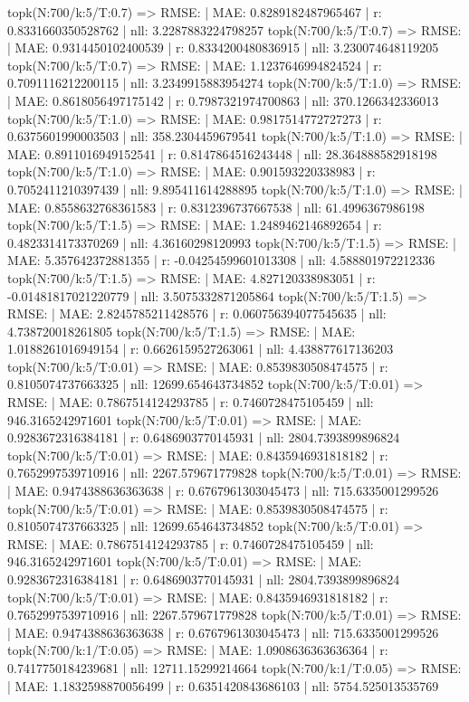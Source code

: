 topk(N:700/k:5/T:0.7) => RMSE: | MAE: 0.8289182487965467 | r: 0.8331660350528762 | nll: 3.2287883224798257
topk(N:700/k:5/T:0.7) => RMSE: | MAE: 0.9314450102400539 | r: 0.8334200480836915 | nll: 3.230074648119205
topk(N:700/k:5/T:0.7) => RMSE: | MAE: 1.1237646994824524 | r: 0.7091116212200115 | nll: 3.2349915883954274
topk(N:700/k:5/T:1.0) => RMSE: | MAE: 0.8618056497175142 | r: 0.7987321974700863 | nll: 370.1266342336013
topk(N:700/k:5/T:1.0) => RMSE: | MAE: 0.9817514772727273 | r: 0.6375601990003503 | nll: 358.2304459679541
topk(N:700/k:5/T:1.0) => RMSE: | MAE: 0.8911016949152541 | r: 0.8147864516243448 | nll: 28.364888582918198
topk(N:700/k:5/T:1.0) => RMSE: | MAE: 0.901593220338983 | r: 0.7052411210397439 | nll: 9.895411614288895
topk(N:700/k:5/T:1.0) => RMSE: | MAE: 0.8558632768361583 | r: 0.8312396737667538 | nll: 61.4996367986198
topk(N:700/k:5/T:1.5) => RMSE: | MAE: 1.2489462146892654 | r: 0.4823314173370269 | nll: 4.36160298120993
topk(N:700/k:5/T:1.5) => RMSE: | MAE: 5.357642372881355 | r: -0.04254599601013308 | nll: 4.588801972212336
topk(N:700/k:5/T:1.5) => RMSE: | MAE: 4.827120338983051 | r: -0.01481817021220779 | nll: 3.5075332871205864
topk(N:700/k:5/T:1.5) => RMSE: | MAE: 2.8245785211428576 | r: 0.060756394077545635 | nll: 4.738720018261805
topk(N:700/k:5/T:1.5) => RMSE: | MAE: 1.0188261016949154 | r: 0.6626159527263061 | nll: 4.438877617136203
topk(N:700/k:5/T:0.01) => RMSE: | MAE: 0.8539830508474575 | r: 0.8105074737663325 | nll: 12699.654643734852
topk(N:700/k:5/T:0.01) => RMSE: | MAE: 0.7867514124293785 | r: 0.7460728475105459 | nll: 946.3165242971601
topk(N:700/k:5/T:0.01) => RMSE: | MAE: 0.9283672316384181 | r: 0.6486903770145931 | nll: 2804.7393899896824
topk(N:700/k:5/T:0.01) => RMSE: | MAE: 0.8435946931818182 | r: 0.7652997539710916 | nll: 2267.579671779828
topk(N:700/k:5/T:0.01) => RMSE: | MAE: 0.9474388636363638 | r: 0.6767961303045473 | nll: 715.6335001299526
topk(N:700/k:5/T:0.01) => RMSE: | MAE: 0.8539830508474575 | r: 0.8105074737663325 | nll: 12699.654643734852
topk(N:700/k:5/T:0.01) => RMSE: | MAE: 0.7867514124293785 | r: 0.7460728475105459 | nll: 946.3165242971601
topk(N:700/k:5/T:0.01) => RMSE: | MAE: 0.9283672316384181 | r: 0.6486903770145931 | nll: 2804.7393899896824
topk(N:700/k:5/T:0.01) => RMSE: | MAE: 0.8435946931818182 | r: 0.7652997539710916 | nll: 2267.579671779828
topk(N:700/k:5/T:0.01) => RMSE: | MAE: 0.9474388636363638 | r: 0.6767961303045473 | nll: 715.6335001299526
topk(N:700/k:1/T:0.05) => RMSE: | MAE: 1.0908636363636364 | r: 0.7417750184239681 | nll: 12711.15299214664
topk(N:700/k:1/T:0.05) => RMSE: | MAE: 1.1832598870056499 | r: 0.6351420843686103 | nll: 5754.525013535769
